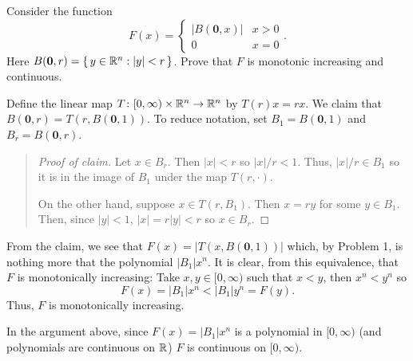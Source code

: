 \begin{problem}
  Consider the function
  \[
    F(x)=
    \begin{cases}
      |B(\mathbf{0},x)|&x>0\\
      0&x=0
    \end{cases}.
  \]
  Here $B(\mathbf{0},r)=\left\{\, y \in\mathbb{R}^n:| y |<r\,\right\}$. Prove
  that $F$ is monotonic increasing and continuous.
\end{problem}
\begin{solution}
  Define the linear map $T\colon[0,\infty)\times\mathbb{R}^n\to\mathbb{R}^n$ by
  $T(r) x = rx $. We claim that $B(\mathbf{0},r)=T(r,B(\mathbf{0},1))$. To
  reduce notation, set $B_1= B(\mathbf{0},1)$ and $B_r= B(\mathbf{0},r)$.
  \begin{quote}
    \begin{proof}[Proof of claim]
      Let $x\in B_r$. Then $|x |<r$ so $|x |/r<1$. Thus, $|x |/r\in B_1$ so
      it is in the image of $B_1$ under the map $T(r,\cdot)$.

      On the other hand, suppose $x\in T(r,B_1)$. Then $x =r y $ for some
      $ y \in B_1$. Then, since $| y |<1$, $|x |=r| y |<r$ so $x\in B_r$.
    \end{proof}
  \end{quote}

  From the claim, we see that $F(x)=|T(x,B(\mathbf{0},1))|$ which, by
  Problem 1, is nothing more that the polynomial $|B_1|x^n$. It is clear,
  from this equivalence, that $F$ is monotonically increasing: Take
  $x,y\in[0,\infty)$ such that $x<y$, then $x^n<y^n$ so
  \begin{equation}
    \label{eq:prep:1:7}
    F(x)=|B_1|x^n<|B_1|y^n=F(y).
  \end{equation}
  Thus, $F$ is monotonically increasing.

  In the argument above, since $F(x)=|B_1|x^n$ is a polynomial in
  $[0,\infty)$ (and polynomials are continuous on $\mathbb{R}$) $F$ is continuous
  on $[0,\infty)$.
\end{solution}

